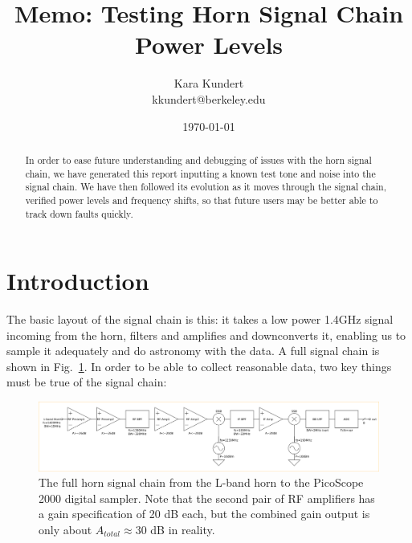 \documentclass[11pt]{article}
\makeatletter
\newcommand{\thetitle}{Memo: Testing Horn Signal Chain Power Levels}
\newcommand{\theauthor}{Kara Kundert}
\newcommand{\theauthorsemail}{kkundert@berkeley.edu}
\newcommand{\thedate}{\today}
\makeatother
\begin{document}
\title{
    \sffamily\bfseries\huge
    \thetitle \\
}
\author{
    \sffamily\theauthor \\
    \sffamily\theauthorsemail
}
\date{\centering\thedate}
\maketitle
\sloppy

\begin{abstract}
 In order to ease future understanding and debugging of issues with the horn 
 signal chain, we have generated this report inputting a known test tone and 
 noise into the signal chain. We have then followed its evolution as it moves 
 through the signal chain, verified power levels and frequency shifts, so that 
 future users may be better able to track down faults quickly.
\end{abstract}

\section{Introduction}

The basic layout of the signal chain is this: it takes a low power 1.4GHz 
signal incoming from the horn, filters and amplifies and downconverts it, 
enabling us to sample it adequately and do astronomy with the data. A full 
signal chain is shown in Fig.~\ref{fig:block-diagram}. In order to be able to 
collect reasonable data, two key things must be true of the signal chain:

\begin{figure}
    \begin{center}
    \includegraphics[width=\linewidth]{block_diagram.png}
    \end{center}
    \caption{
        The full horn signal chain from the L-band horn to the PicoScope 2000 
        digital sampler. Note that the second pair of RF amplifiers has a gain 
        specification of 20 dB each, but the combined gain output is only about 
        $A_{total} \approx 30$ dB in reality.
    }
    \label{fig:block-diagram}
\end{figure}
\end{document}
